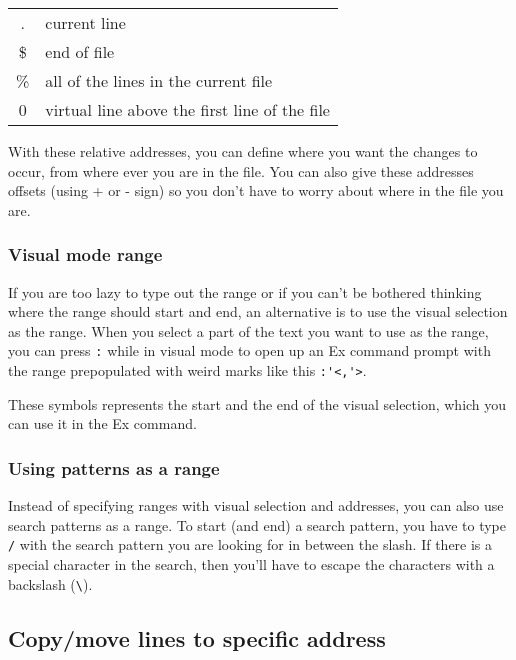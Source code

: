 \begin{tabular}{c|l}
    .  & current line\\
    \$ & end of file\\
    \% & all of the lines in the current file\\
    0  & virtual line above the first line of the file\\
\end{tabular}
\newline

With these relative addresses, you can define where you want the changes to occur, from where ever you are in the file.
You can also give these addresses offsets (using + or - sign) so you don't have to worry about where in the file you are.

\subsubsection{Visual mode range}

If you are too lazy to type out the range or if you can't be bothered thinking where the range should start and end, an alternative is to use the visual selection as the range.
When you select a part of the text you want to use as the range, you can press \verb|:| while in visual mode to open up an Ex command prompt with the range prepopulated with weird marks like this \verb|:'<,'>|.

These symbols represents the start and the end of the visual selection, which you can use it in the Ex command.

\subsubsection{Using patterns as a range}

Instead of specifying ranges with visual selection and addresses, you can also use search patterns as a range.
To start (and end) a search pattern, you have to type \verb|/| with the search pattern you are looking for in between the slash.
If there is a special character in the search, then you'll have to escape the characters with a backslash (\verb|\|).

\subsection{Copy/move lines to specific address}




















